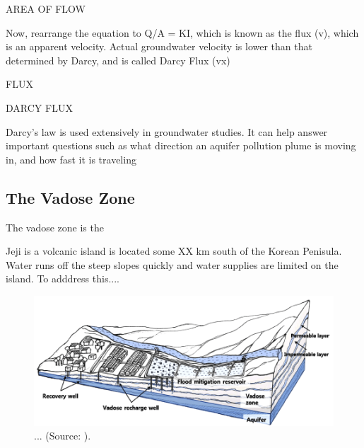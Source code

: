 \documentclass{book}\usepackage{knitr}
\begin{document}
AREA OF FLOW

Now, rearrange the equation to Q/A = KI, which is known as the flux (v), which is an apparent velocity. Actual groundwater velocity is lower than that determined by Darcy, and is called Darcy Flux (vx)

FLUX

DARCY FLUX

Darcy's law is used extensively in groundwater studies. It can help answer important questions such as what direction an aquifer pollution plume is moving in, and how fast it is traveling

\subsection{The Vadose Zone}

The vadose zone is the 

Jeji is a volcanic island is located some XX km south of the Korean Penisula. Water runs off the steep slopes quickly and water supplies are limited on the island. To adddress this...\citet{lee2017fifty}.

\begin{figure}
\includegraphics[width=\linewidth]{images/critical-zone/Lee-Vadose.png}
\caption{... (Source: \citep{lee2017fifty}).}
\label{fig:vadose2}
\end{figure}
\end{document}
